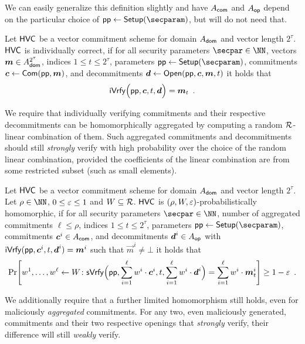 We can easily generalize this definition slightly and have $A_{\mathsf{com}}$ and $A_{\mathsf{op}}$ depend on the particular choice of $\params\gets\setup(\secparam)$, but will do not need that.
\begin{definition}\label{def:individual_correctness}
Let $\mathsf{HVC}$ be a vector commitment scheme for domain $A_{\mathsf{dom}}$ and vector length $2^\tau$.
  $\mathsf{HVC}$ is individually correct, if for all security parameters $\secpar\in\NN$, vectors $\boldsymbol{m}\in A_{\mathsf{dom}}^{2^\tau}$, indices $1\leq t \leq 2^\tau$, parameters $\params \gets \setup(\secparam)$, commitments $\boldsymbol{c} \gets \mathsf{Com}(\mathsf{pp},\boldsymbol{m})$, and decommitments $\boldsymbol{d} \gets \mathsf{Open}(\mathsf{pp},\boldsymbol{c},\boldsymbol{m},t)$ it holds that
  \[
    \mathsf{iVrfy}\Bigl(\mathsf{pp},\boldsymbol{c},t,\boldsymbol{d}\Bigr) = \boldsymbol{m}_{t}\enspace.
  \]
\end{definition}
%
We require that individually verifying commitments and their respective decommitments can be homomorphically aggregated by computing a random $\mathcal{R}$-linear combination of them.
Such aggregated commitments and decommitments should still \emph{strongly} verify with high probability over the choice of the random linear combination, provided the coefficients of the linear combination are from some restricted subset (such as small elements).

\begin{definition}\label{def:probabilist_homomorphism}
Let $\mathsf{HVC}$ be a vector commitment scheme for domain $A_{\mathsf{dom}}$ and vector length $2^\tau$. %
Let $\rho\in\NN$, $0\leq \varepsilon \leq 1$ and $W\subseteq\mathcal{R}$.
$\mathsf{HVC}$ is $(\rho,W,\varepsilon)$-probabilistically homomorphic, if for all security parameters $\secpar\in\NN$, number of aggregated commitments $\ell \leq \rho$, indices
$1\leq t \leq 2^\tau$,
parameters $\params \gets \setup(\secparam)$, commitments $\boldsymbol{c}^i\in A_{\mathsf{com}}$, and decommitments $\boldsymbol{d}^i\in A_{\mathsf{op}}$ with $\mathsf{iVrfy}(\mathsf{pp},\boldsymbol{c}^i,t,\boldsymbol{d}^i) = \boldsymbol{m}^i$ such that $\vec{m}^i \neq \bot$ it holds that
  \[
    \Pr\mleft[
      w^1,\dots,w^{\ell} \gets W \colon
      \sverify\Bigl(\params,\sum_{i=1}^{\ell}w^i\cdot \vec{c}^i,t,\sum_{i=1}^{\ell}w^i\cdot \vec{d}^i\Bigr) = \sum_{i=1}^{\ell}w^i\cdot\vec{m}^i_{t}
    \mright] \geq 1-\errorbound\enspace.
  \]
\end{definition}
%
We additionally require that a further limited homomorphism still holds, even for maliciously \emph{aggregated} commitments.
For any two, even maliciously generated, commitments and their two respective openings that \emph{strongly} verify, their difference will still \emph{weakly} verify.

